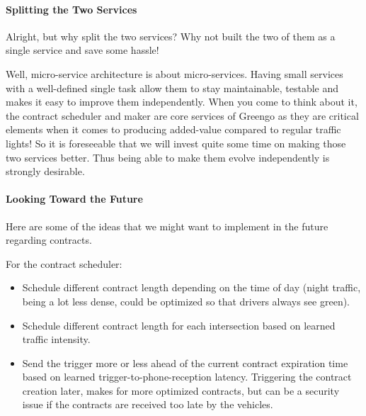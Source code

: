 \documentclass[letterpaper,10pt,english]{sphinxmanual}
\begin{document}
\paragraph{Splitting the Two Services}
\label{\detokenize{blog/2020/01/contract_maker_vs_contract_scheduler:splitting-the-two-services}}
Alright, but why split the two services? Why not built the two of them as a single service and save some hassle!

Well, micro-service architecture is about micro-services. Having small services with a well-defined single task allow them to stay maintainable, testable and makes it easy to improve them independently. When you come to think about it, the contract scheduler and maker are core services of Greengo as they are critical elements when it comes to producing added-value compared to regular traffic lights! So it is foreseeable that we will invest quite some time on making those two services better. Thus being able to make them evolve independently is strongly desirable.

\begin{figure}[htbp]
\centering

\noindent{}
\end{figure}


\paragraph{Looking Toward the Future}
\label{\detokenize{blog/2020/01/contract_maker_vs_contract_scheduler:looking-toward-the-future}}
Here are some of the ideas that we might want to implement in the future regarding contracts.

For the contract scheduler:
\begin{itemize}
\item {} 
Schedule different contract length depending on the time of day (night traffic, being a lot less dense, could be optimized so that drivers always see green).

\item {} 
Schedule different contract length for each intersection based on learned traffic intensity.

\item {} 
Send the trigger more or less ahead of the current contract expiration time based on learned trigger-to-phone-reception latency. Triggering the contract creation later, makes for more optimized contracts, but can be a security issue if the contracts are received too late by the vehicles.

\end{itemize}
\end{document}
